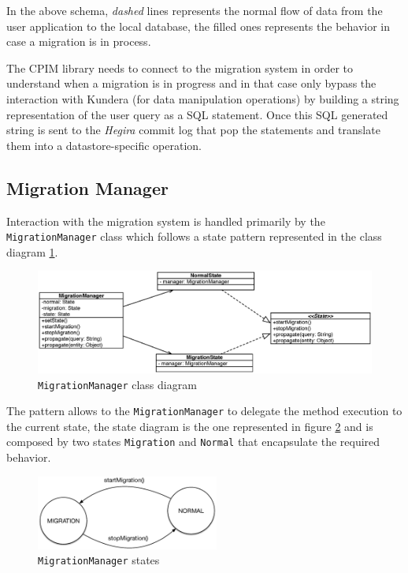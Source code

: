 \noindent In the above schema, \textit{dashed} lines represents the normal flow of data from the user application to the local database, the filled ones represents the behavior in case a migration is in process.

\noindent The CPIM library needs to connect to the migration system in order to understand when a migration is in progress and in that case only bypass the interaction with Kundera (for data manipulation operations) by building a string representation of the user query as a SQL statement. Once this SQL generated string is sent to the \textit{Hegira} commit log that pop the statements and translate them into a datastore-specific operation.

\subsection{Migration Manager}
Interaction with the migration system is handled primarily by the \texttt{MigrationManager} class which follows a state pattern represented in the class diagram \ref{fig:migration-class-diagram}. 
 
\begin{figure}[tbh]
  \centering
  \includegraphics[width=14cm]{images/migration_class_diagram}
  \caption{\texttt{MigrationManager} class diagram}
  \label{fig:migration-class-diagram}
\end{figure} 

\noindent The pattern allows to the \texttt{MigrationManager} to delegate the method execution to the current state, the state diagram is the one represented in figure \ref{fig:migration-fsa} and is composed by two states \texttt{Migration} and \texttt{Normal} that encapsulate the required behavior.
    
\begin{figure}[tbh]
  \centering
  \includegraphics[width=6cm]{images/migration_fsa}
  \caption{\texttt{MigrationManager} states}
  \label{fig:migration-fsa}
\end{figure} 

